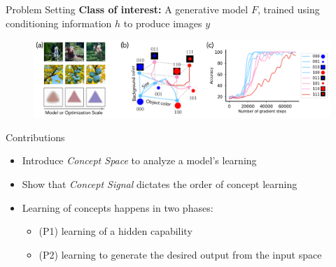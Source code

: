 \begin{frame}[t]{Problem Setting}
 \qquad \textbf{Class of interest:} A generative model $F$, trained
using \\\qquad conditioning information $h$ to produce images $y$
\begin{figure}
    \centering
    \includegraphics[width=0.9\linewidth]{figures/figure_1.png}
\end{figure}
\end{frame}

\begin{frame}[t]{Contributions}
     \begin{itemize}
        \item<1-3>Introduce \textit{Concept Space} to analyze a model’s learning
        \item<2-3>Show that \textit{Concept Signal} dictates the order of concept learning
        \item<3-3>Learning of concepts happens in two phases:
        \begin{itemize}
            \item (P1) learning of a hidden capability
            \item (P2) learning to generate the desired output from the input space
        \end{itemize}
     \end{itemize}
\end{frame}


